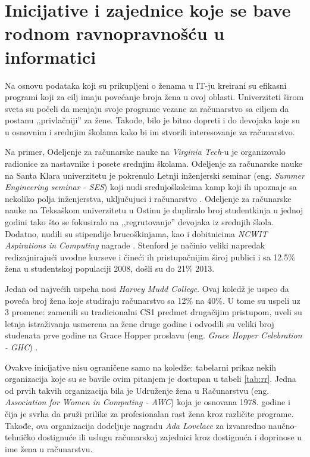 \section{Inicijative i zajednice koje se bave rodnom ravnopravnošću u informatici}

Na osnovu podataka koji su prikupljeni o ženama u IT-ju kreirani su efikasni programi koji za cilj imaju povećanje broja žena u ovoj oblasti. 
Univerziteti širom sveta su počeli da menjaju svoje programe vezane za računarstvo sa ciljem da postanu ,,privlačniji'' za žene. Takođe, bilo je bitno dopreti i do devojaka koje su u osnovnim i srednjim školama kako bi im stvorili interesovanje za računarstvo. 

Na primer, Odeljenje za računarske nauke na \emph{Virginia Tech}-u je organizovalo radionice za nastavnike i posete srednjim školama. Odeljenje za računarske nauke na Santa Klara univerzitetu je pokrenulo Letnji inženjerski seminar (eng. \emph{Summer Engineering seminar - SES}) koji nudi srednjoškolcima kamp koji ih upoznaje sa nekoliko polja inženjerstva, uključujuci i računarstvo \cite{hamilton2016gender}. Odeljenje za računarske nauke na Teksaškom univerzitetu u Ostinu je dupliralo broj studentkinja u jednoj godini tako što se fokusiralo na ,,regrutovanje'' devojaka iz srednjih škola. Dodatno, nudili su stipendije brucoškinjama, kao i dobitnicima \emph{NCWIT Aspirations in Computing} nagrade \cite{hamilton2016gender}. 
Stenford je načinio veliki napredak redizajnirajući uvodne kurseve i čineći ih pristupačnijim široj publici i sa 12.5\% žena u studentskoj populaciji 2008, došli su do 21\% 2013. \cite{hamilton2016gender}

Jedan od najvećih uspeha nosi \emph{Harvey Mudd College}. Ovaj koledž je uspeo da poveća broj žena koje studiraju računarstvo sa 12\% na 40\%. U tome su uspeli uz 3 promene: zamenili su tradicionalni CS1 predmet drugačijim pristupom, uveli su letnja istraživanja usmerena na žene druge godine i odvodili su veliki broj studenata prve godine na Grace Hopper proslavu (eng. \emph{Grace Hopper Celebration - GHC}) \cite{hamilton2016gender}.

Ovakve inicijative nisu ograničene samo na koledže: tabelarni prikaz nekih organizacija koje su se bavile ovim pitanjem je dostupan u tabeli \ref{tab:rr}. Jedna od prvih takvih organizacija bila je Udruženje žena u Računarstvu (eng. \emph{Association for Women in Computing - AWC}) koja je osnovana 1978. godine i čija je svrha da pruži prilike za profesionalan rast žena kroz različite programe. Takođe, ova organizacija dodeljuje nagradu \emph{Ada Lovelace} za izvanredno naučno-tehničko dostignuće ili uslugu računarskoj zajednici kroz dostignuća i doprinose u ime žena u računarstvu.
	 

